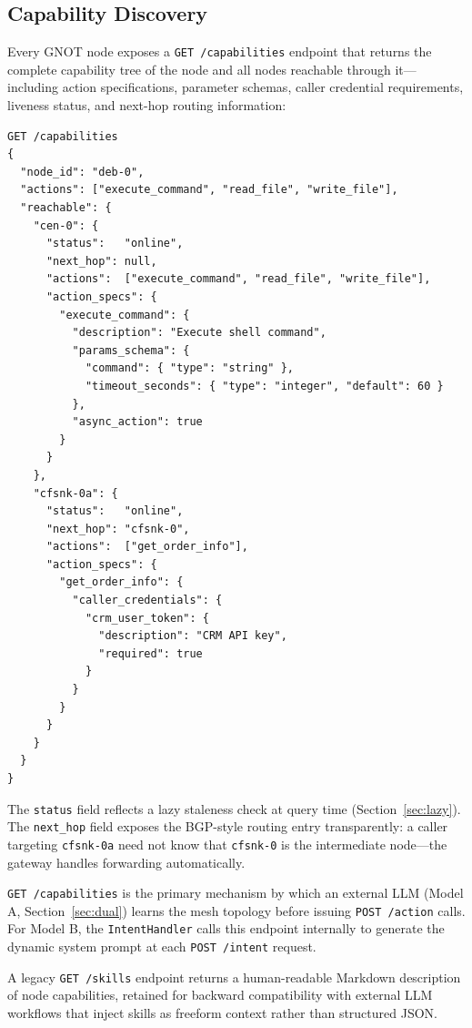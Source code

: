 \documentclass[10pt,twocolumn]{article}
\begin{document}
\subsection{Capability Discovery}
\label{sec:discovery}

Every GNOT node exposes a \texttt{GET /capabilities} endpoint that
returns the complete capability tree of the node and all nodes
reachable through it---including action specifications, parameter
schemas, caller credential requirements, liveness status, and
next-hop routing information:

\begin{lstlisting}[caption={Capability tree response (excerpt)}]
GET /capabilities
{
  "node_id": "deb-0",
  "actions": ["execute_command", "read_file", "write_file"],
  "reachable": {
    "cen-0": {
      "status":   "online",
      "next_hop": null,
      "actions":  ["execute_command", "read_file", "write_file"],
      "action_specs": {
        "execute_command": {
          "description": "Execute shell command",
          "params_schema": {
            "command": { "type": "string" },
            "timeout_seconds": { "type": "integer", "default": 60 }
          },
          "async_action": true
        }
      }
    },
    "cfsnk-0a": {
      "status":   "online",
      "next_hop": "cfsnk-0",
      "actions":  ["get_order_info"],
      "action_specs": {
        "get_order_info": {
          "caller_credentials": {
            "crm_user_token": {
              "description": "CRM API key",
              "required": true
            }
          }
        }
      }
    }
  }
}
\end{lstlisting}

The \texttt{status} field reflects a lazy staleness check at query
time (Section~\ref{sec:lazy}). The \texttt{next\_hop} field exposes
the BGP-style routing entry transparently: a caller targeting
\texttt{cfsnk-0a} need not know that \texttt{cfsnk-0} is the
intermediate node---the gateway handles forwarding automatically.

\texttt{GET /capabilities} is the primary mechanism by which an
external LLM (Model A, Section~\ref{sec:dual}) learns the mesh
topology before issuing \texttt{POST /action} calls. For Model B, the
\texttt{IntentHandler} calls this endpoint internally to generate the
dynamic system prompt at each \texttt{POST /intent} request.

A legacy \texttt{GET /skills} endpoint returns a human-readable
Markdown description of node capabilities, retained for backward
compatibility with external LLM workflows that inject skills as
freeform context rather than structured JSON.
\end{document}
